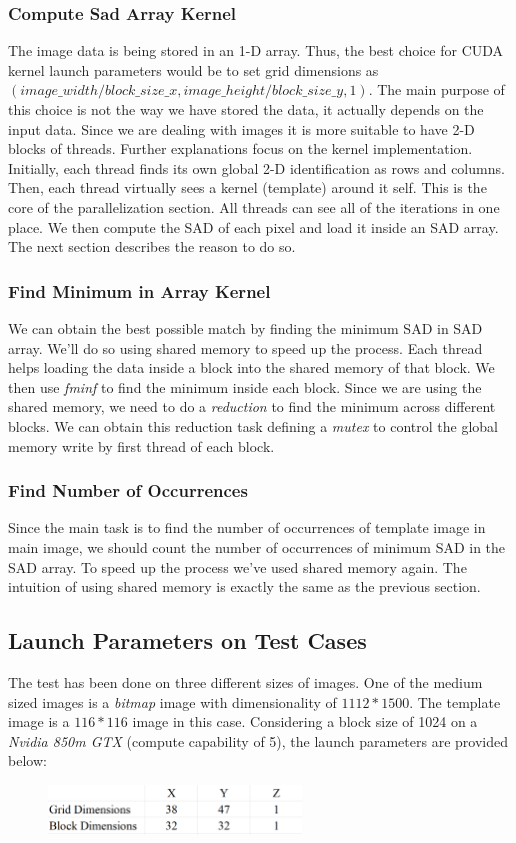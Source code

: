 \subsubsection{Compute Sad Array Kernel}
The image data is being stored in an 1-D array. Thus, the best choice for CUDA kernel launch parameters would be to set grid dimensions as $(image\_width/block\_size\_x, image\_height/block\_size\_y, 1)$. The main purpose of this choice is not the way we have stored the data, it actually depends on the input data. Since we are dealing with images it is more suitable to have 2-D blocks of threads. Further explanations focus on the kernel implementation. Initially, each thread finds its own global 2-D identification as rows and columns. Then, each thread virtually sees a kernel (template) around it self. This is the core of the parallelization section. All threads can see all of the iterations in one place. We then compute the SAD of each pixel and load it inside an SAD array. The next section describes the reason to do so.

\subsubsection{Find Minimum in Array Kernel}
We can obtain the best possible match by finding the minimum SAD in SAD array. We'll do so using shared memory to speed up the process. Each thread helps loading the data inside a block into the shared memory of that block. We then use \textit{fminf} to find the minimum inside each block. Since we are using the shared memory, we need to do a \textit{reduction} to find the minimum across different blocks. We can obtain this reduction task defining a \textit{mutex} to control the global memory write by first thread of each block.

\subsubsection{Find Number of Occurrences}
Since the main task is to find the number of occurrences of template image in main image, we should count the number of occurrences of minimum SAD in the SAD array. To speed up the process we've used shared memory again. The intuition of using shared memory is exactly the same as the previous section.

\subsection{Launch Parameters on Test Cases}
The test has been done on three different sizes of images. One of the medium sized images is a \textit{bitmap} image with dimensionality of $1112 * 1500$. The template image is a $116*116$ image in this case. Considering a block size of 1024 on a \textit{Nvidia 850m GTX} (compute capability of 5), the launch parameters are provided below:
\begin{figure}[!h]\centering
	\includegraphics[width=0.6\textwidth]{grid_block.PNG}
	\label{pl1}
\end{figure}


